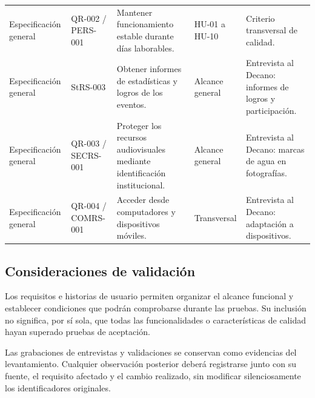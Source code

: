 {\begin{longtable}{P{0.18\textwidth} P{0.18\textwidth} P{0.22\textwidth} P{0.12\textwidth} P{0.22\textwidth}}
Especificación general & QR-002 / PERS-001 & Mantener funcionamiento estable durante días laborables. & HU-01 a HU-10 & Criterio transversal de calidad.\\
Especificación general & StRS-003 & Obtener informes de estadísticas y logros de los eventos. & Alcance general & Entrevista al Decano: informes de logros y participación.\\
Especificación general & QR-003 / SECRS-001 & Proteger los recursos audiovisuales mediante identificación institucional. & Alcance general & Entrevista al Decano: marcas de agua en fotografías.\\
Especificación general & QR-004 / COMRS-001 & Acceder desde computadores y dispositivos móviles. & Transversal & Entrevista al Decano: adaptación a dispositivos.\\
\bottomrule
\end{longtable}
}

\subsection{Consideraciones de validación}
Los requisitos e historias de usuario permiten organizar el alcance funcional y establecer condiciones que podrán comprobarse durante las pruebas. Su inclusión no significa, por sí sola, que todas las funcionalidades o características de calidad hayan superado pruebas de aceptación.

Las grabaciones de entrevistas y validaciones se conservan como evidencias del levantamiento. Cualquier observación posterior deberá registrarse junto con su fuente, el requisito afectado y el cambio realizado, sin modificar silenciosamente los identificadores originales.
